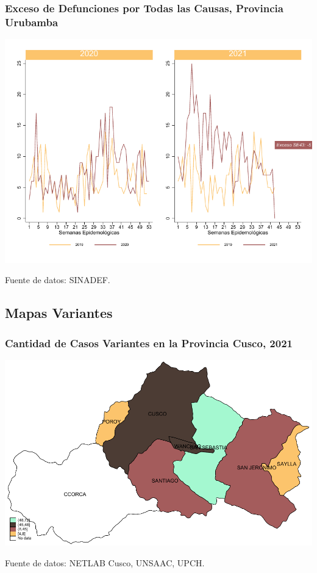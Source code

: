 \documentclass[xcolor=table]{beamer}
\begin{document}
\begin{frame}
	\frametitle{Exceso de Defunciones por Todas las Causas, Provincia Urubamba}
	\vspace{-.5cm}
	\begin{center}
		\includegraphics[width=0.8\linewidth, trim={0cm .5cm 0cm 0.2cm},clip]{../figuras/exceso_13.pdf}
	\end{center}
	{\tiny Fuente de datos: SINADEF.} \hyperlink{indice}{} 
	
	\hyperlink{indicadores_provinciales}{}
\end{frame}

\subsection{Mapas Variantes}
	\begin{frame}[label=mapa_provincia_cusco]
	\frametitle{Cantidad de Casos Variantes en la Provincia Cusco, 2021}
	\begin{center}
		\includegraphics[width=0.65\linewidth]{../figuras/variantes_distrital_cusco.pdf}
	\end{center}
	{\tiny Fuente de datos: NETLAB Cusco, UNSAAC, UPCH.}
	
	\hyperlink{mapa_variantes}{}
	\end{frame}
\end{document}

